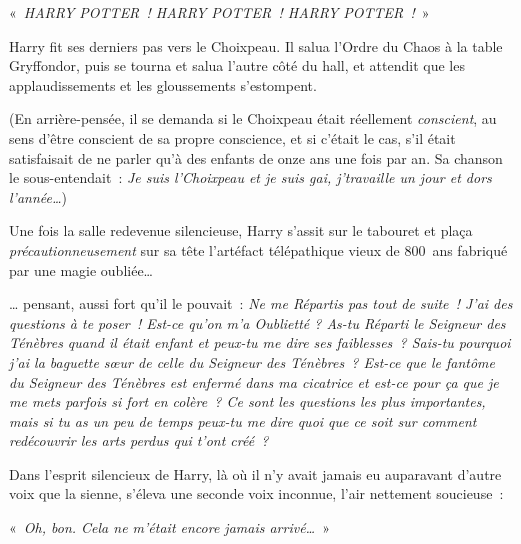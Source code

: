 «~\emph{HARRY POTTER~! HARRY POTTER~! HARRY POTTER~!}~»

Harry fit ses derniers pas vers le Choixpeau.
Il salua l'Ordre du Chaos à la table Gryffondor, puis se tourna et salua l'autre côté du hall, et attendit que les applaudissements et les gloussements s'estompent.

(En arrière-pensée, il se demanda si le Choixpeau était réellement \emph{conscient}, au sens d'être conscient de sa propre conscience, et si c'était le cas, s'il était satisfaisait de ne parler qu'à des enfants de onze ans une fois par an.
Sa chanson le sous-entendait~: \emph{Je suis l'Choixpeau et je suis gai, j'travaille un jour et dors l'année…})

Une fois la salle redevenue silencieuse, Harry s'assit sur le tabouret et plaça \emph{précautionneusement} sur sa tête l'artéfact télépathique vieux de 800~ans fabriqué par une magie oubliée…

… pensant, aussi fort qu'il le pouvait~:
\emph{Ne me Répartis pas tout de suite~! J'ai des questions à te poser~!
Est-ce qu'on m'a Oublietté ?
As-tu Réparti le Seigneur des Ténèbres quand il était enfant et peux-tu me dire ses faiblesses~?
Sais-tu pourquoi j'ai la baguette sœur de celle du Seigneur des Ténèbres~?
Est-ce que le fantôme du Seigneur des Ténèbres est enfermé dans ma cicatrice et est-ce pour ça que je me mets parfois si fort en colère~?
Ce sont les questions les plus importantes, mais si tu as un peu de temps peux-tu me dire quoi que ce soit sur comment redécouvrir les arts perdus qui t'ont créé~?}

Dans l'esprit silencieux de Harry, là où il n'y avait jamais eu auparavant d'autre voix que la sienne, s'éleva une seconde voix inconnue, l'air nettement soucieuse~:

«~\emph{Oh, bon. Cela ne m'était encore jamais arrivé…}~»

